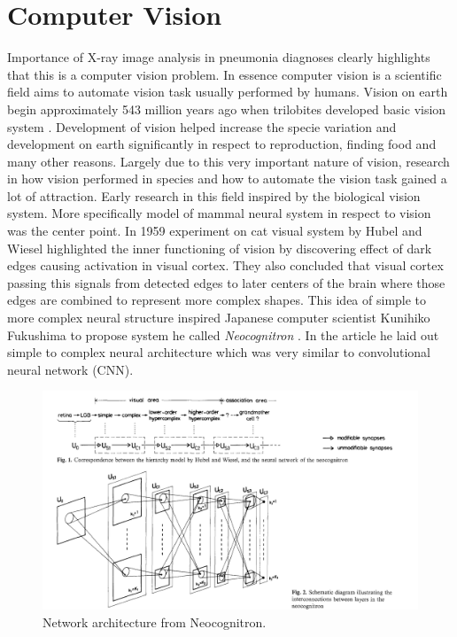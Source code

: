\documentclass[12pt, twoside, a4paper]{article}
\begin{document}
\section{Computer Vision}
Importance of X-ray image analysis in pneumonia diagnoses clearly highlights that this is a computer vision problem. In essence computer vision is a scientific field aims to automate vision task usually performed by humans. Vision on earth begin approximately 543 million years ago when trilobites developed basic vision system \cite{firstvision}. Development of vision helped increase the specie variation and development on earth significantly in respect to reproduction, finding food and many other reasons. Largely due to this very important nature of vision, research in how vision performed in species and how to automate the vision task gained a lot of attraction. Early research in this field inspired by the biological vision system. More specifically model of mammal neural system in respect to vision was the center point. In 1959 experiment on cat visual system by Hubel and Wiesel \cite{hubel:single} highlighted the inner functioning of vision by discovering effect of dark edges causing activation in visual cortex. They also concluded that visual cortex passing this signals from detected edges to later centers of the brain where those edges are combined to represent more complex shapes. This idea of simple to more complex neural structure inspired Japanese computer scientist Kunihiko Fukushima to propose system he called \textit{Neocognitron} \cite{fukushima:neocognitronbc}. In the article he laid out simple to complex neural architecture which was very similar to convolutional neural network (CNN).

\begin{figure}[H]%
    \centering
    \includegraphics[width=\textwidth]{img/fukushima.png}%
    \caption{Network architecture from Neocognitron.}%
    \label{fig:neocognitron}%
\end{figure}
\end{document}
